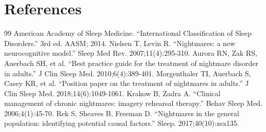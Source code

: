 \section*{References}
\begin{thebibliography}{99}
 American Academy of Sleep Medicine. ``International Classification of Sleep Disorders.'' 3rd ed. AASM; 2014.
 Nielsen T, Levin R. ``Nightmares: a new neurocognitive model.'' Sleep Med Rev. 2007;11(4):295-310.
 Aurora RN, Zak RS, Auerbach SH, et al. ``Best practice guide for the treatment of nightmare disorder in adults.'' J Clin Sleep Med. 2010;6(4):389-401.
 Morgenthaler TI, Auerbach S, Casey KR, et al. ``Position paper on the treatment of nightmares in adults.'' J Clin Sleep Med. 2018;14(6):1049-1061.
 Krakow B, Zadra A. ``Clinical management of chronic nightmares: imagery rehearsal therapy.'' Behav Sleep Med. 2006;4(1):45-70.
 Rek S, Sheaves B, Freeman D. ``Nightmares in the general population: identifying potential causal factors.'' Sleep. 2017;40(10):zsx135.
\end{thebibliography}
